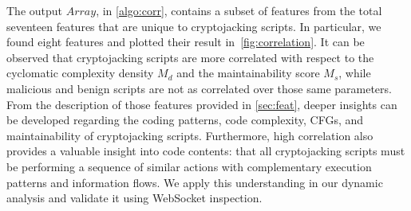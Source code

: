 \documentclass[acmlarge]{acmart}
\newcommand{\cj}{cryptojacking\xspace}
\begin{document}
The output $Array$, in \autoref{algo:corr}, contains a subset of features from the total seventeen features that are unique to \cj scripts. In particular, we found eight features and plotted their result in~\autoref{fig:correlation}. It can be observed that \cj scripts are more correlated with respect to the cyclomatic complexity density $M_d$ and the maintainability score $M_s$, while malicious and benign scripts are not as correlated over those same parameters. From the description of those features provided in \textsection\ref{sec:feat}, deeper insights can be developed regarding the coding patterns, code complexity, CFGs, and maintainability of \cj scripts. Furthermore, high correlation also provides a valuable insight into code contents: that all \cj scripts must be performing a sequence of similar actions with complementary execution patterns and information flows. We apply this understanding in our dynamic analysis and validate it using WebSocket inspection. 
\end{document}
